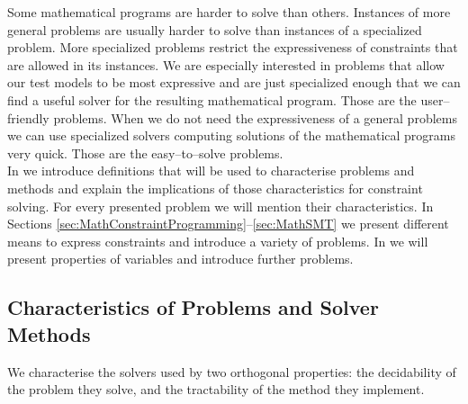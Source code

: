 Some mathematical programs are harder to solve than others. Instances of more general problems are usually harder to solve than instances of a specialized problem. More specialized problems restrict the expressiveness of constraints that are allowed in its instances. We are especially interested in problems that allow our test models to be most expressive and are just specialized enough that we can find a useful solver for the resulting mathematical program. Those are the user--friendly problems. When we do not need the expressiveness of a general problems we can use specialized solvers computing solutions of the mathematical programs very quick. Those are the easy--to--solve problems.\\
In  we introduce definitions that will be used to characterise problems and methods and explain the implications of those characteristics for constraint solving. For every presented problem we will mention their characteristics. In Sections \ref{sec:MathConstraintProgramming}--\ref{sec:MathSMT} we present different means to express constraints and introduce a variety of problems. In  we will present properties of variables and introduce further problems.
\subsection{Characteristics of Problems and Solver Methods}
\label{sec:computability}
We characterise the solvers used by two orthogonal properties: the decidability of the problem they solve, and the tractability of the method they implement.
